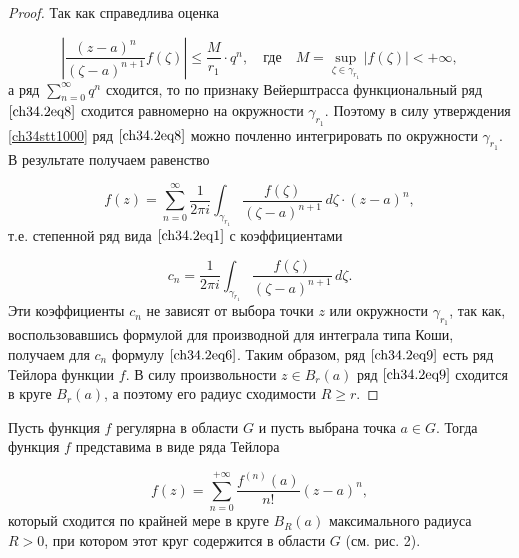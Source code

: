 \begin{proof}
Так как справедлива оценка

$$
\left| \frac{(z - a)^n}{(\zeta - a)^{n + 1}} f(\zeta) \right| \le \frac{M}{r_1} \cdot q^n, \quad \text{где} \quad M = \sup_{\zeta \in \gamma_{r_1}} |f(\zeta)| < +\infty,
$$
а ряд $\sum\limits_{n = 0}^{\infty} q^n$ сходится, то по признаку Вейерштрасса функциональный ряд $\eqref{ch34.2eq8}$ сходится равномерно на окружности $\gamma_{r_1}$. Поэтому в силу утверждения \ref{ch34stt1000} ряд $\eqref{ch34.2eq8}$ можно почленно интегрировать по окружности $\gamma_{r_1}$. В результате получаем равенство

\begin{equation} \label{ch34.2eq9}
f(z) = \sum\limits_{n = 0}^{\infty} \frac{1}{2\pi i} \int_{\gamma_{r_1}} \frac{f(\zeta)}{(\zeta - a)^{n + 1}} \,d\zeta \cdot (z - a)^n,
\end{equation}
т.е. степенной ряд вида $\eqref{ch34.2eq1}$ с коэффициентами

\begin{equation} \label{ch34.2eq10}
c_n = \frac{1}{2\pi i} \int_{\gamma_{r_1}} \frac{f(\zeta)}{(\zeta - a)^{n + 1}} \,d\zeta.
\end{equation}
Эти коэффициенты $c_n$ не зависят от выбора точки $z$ или окружности $\gamma_{r_1}$, так как, воспользовавшись формулой для производной для интеграла типа Коши, получаем для $c_n$ формулу $\eqref{ch34.2eq6}$. Таким образом, ряд $\eqref{ch34.2eq9}$ есть ряд Тейлора функции $f$. В силу произвольности $z \in B_r(a)$ ряд $\eqref{ch34.2eq9}$ сходится в круге $B_r(a)$, а поэтому его радиус сходимости $R \ge r$.
\end{proof}

\begin{cons} \label{cons1}
Пусть функция $f$ регулярна в области $G$ и пусть выбрана точка $a \in G$. Тогда функция $f$ представима в виде ряда Тейлора

$$
f(z) = \sum\limits_{n = 0}^{+\infty} \frac{f^{(n)}(a)}{n!} (z - a)^n,
$$
который сходится по крайней мере в круге $B_R(a)$ максимального радиуса $R > 0$, при котором этот круг содержится в области $G$ (см. рис. 2).

\end{cons}